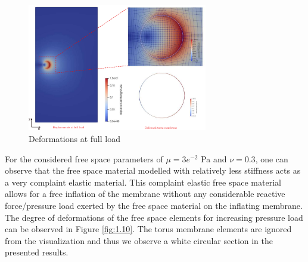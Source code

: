 \documentclass[11pt,a4paper,final]{article}
\begin{document}
\begin{figure}[h!]
\centering
\includegraphics[width=0.7\textwidth]{torus_disp_mue_1e6.pdf}
\caption{Deformations at full load}
\label{fig:1.9}
\end{figure}

For the considered free space parameters of $\mu = 3e^{-2}$ Pa and $\nu = 0.3$, one can observe that the free space material modelled with relatively less stiffness acts as a very complaint elastic material. This complaint elastic free space material allows for a free inflation of the membrane without any considerable reactive force/pressure load exerted by the free space material on the inflating membrane. The degree of deformations of the free space elements for increasing pressure load can be observed in Figure \eqref{fig:1.10}. The torus membrane elements are ignored from the visualization and thus we observe a white circular section in the presented results.\par 
\end{document}
